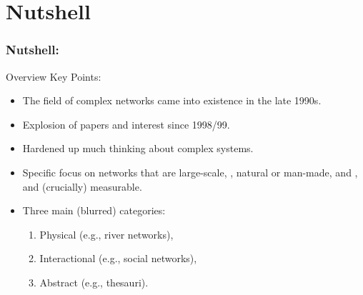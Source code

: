 \section{Nutshell}

\begin{frame}[label=]
  \frametitle{Nutshell:}

  \begin{block}{Overview Key Points:}
    \begin{itemize}
    \item<1->
      The field of complex networks came into
      existence in the late 1990s.
    \item<2->
      Explosion of papers and interest since 1998/99.
    \item<3->
      Hardened up much thinking about complex systems.
    \item<4->
      Specific focus on networks that are 
      \alert{large-scale}, 
      , 
      \alert{natural} or \alert{man-made}, 
       and , 
      and 
      (crucially) \alert{measurable}.
    \item<5->
      Three main (blurred) categories: 
      \begin{enumerate}
      \item 
      \alert{Physical} (e.g., river networks),
      \item 
      \alert{Interactional} (e.g., social networks),
      \item 
      \alert{Abstract} (e.g., thesauri).
      \end{enumerate}
    \end{itemize}
    
  \end{block}

\end{frame}



